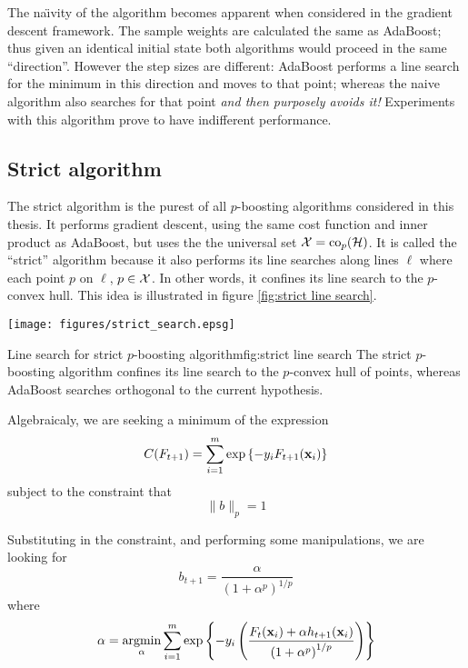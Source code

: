 The na\"{\i}vity of the algorithm becomes apparent when considered in
the gradient descent framework.  The sample weights are calculated
the same as AdaBoost; thus given an identical initial state both
algorithms would proceed in the same ``direction''.  However the step
sizes are different: AdaBoost performs a line search for the minimum
in this direction and moves to that point; whereas the naive algorithm
also searches for that point \emph{and then purposely avoids it!}
Experiments with this algorithm prove to have indifferent performance.

\subsection{Strict algorithm}

The strict algorithm is the purest of all $p$-boosting algorithms
considered in this thesis.  It performs gradient descent, using the
same cost function and inner product as AdaBoost, but uses the the
universal set $\mathcal{X} = \mathrm{co}_p(\mathcal{H})$.  It is called the ``strict''
algorithm because it also performs its line searches along lines
$\ell$ where each point $p$ on $\ell$, $p \in \mathcal{X}$.  In other words,
it confines its line search to the $p$-convex hull.  This idea is
illustrated in figure \ref{fig:strict line search}.

\begin{linefigure}
\begin{center}
\texttt{[image: figures/strict\_search.epsg]}
\end{center}
\begin{capt}{Line search for strict $p$-boosting algorithm}{fig:strict line search}
The strict $p$-boosting algorithm confines its line search to the
$p$-convex hull of points, whereas AdaBoost searches orthogonal to the
current hypothesis.
\end{capt}
\end{linefigure}

Algebraicaly, we are seeking a minimum of the expression
%
\begin{equation}
C(F_{t+1}) = \sum_{i=1}^{m} \exp \left\{ -y_i F_{t+1}(\mathbf{x}_i) \right\}
\end{equation}
%
subject to the constraint that
%
\begin{equation}
\| b \|_{p} = 1
\end{equation}

Substituting in the constraint, and performing some manipulations, we
are looking for
%
\begin{equation}
b_{t+1} = \frac{\alpha}{\left( 1 + \alpha^p \right) ^ {1/p}}
\end{equation}
%
where
%
\begin{equation}
\alpha = \argmin_{\alpha} \sum_{i=1}^{m} \exp \left\{ -y_i \left(
\frac{F_{t}(\bfx_i) + \alpha h_{t+1}(\bfx_i)}{\left( 1 + \alpha ^p
\right) ^{1/p}} \right) \right\}
\label{eqn:strict minimise function}
\end{equation}

